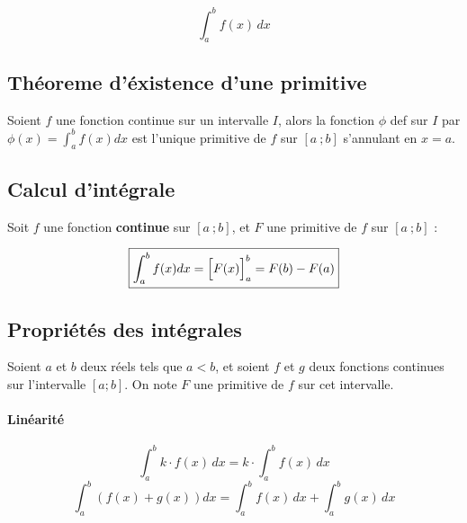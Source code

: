 \documentclass{report}
\begin{document}
      \[
        \int_{a}^{b} f(x) \, dx
      \]
    \subsection{Théoreme d'éxistence d'une primitive}

      Soient $f$ une fonction continue sur un intervalle $I$, alors la fonction $\phi$ def sur $I$ par $\displaystyle\phi(x) = \int_{a}^{b}f(x)dx$ est l'unique primitive de $f$ sur $\left[a ~; b\right]$ s'annulant en $x=a$.

    \subsection{Calcul d'intégrale}

      Soit $f$ une fonction \textbf{continue} sur $\left[a ~; b\right]$, et $F$ une primitive de $f$ sur $\left[a ~; b\right]$ : 

      \[\boxed{\int_{a}^{b}f(x)dx = \Bigl[ F(x) \Bigr]^b_a = F(b) - F(a)}\]


    \subsection{Propriétés des intégrales}

      Soient \( a \) et \( b \) deux réels tels que \( a < b \), et soient \( f \) et \( g \) deux fonctions continues sur l’intervalle \( [a ; b] \). On note \( F \) une primitive de \( f \) sur cet intervalle.

      \paragraph{Linéarité}
      \[
      \int_a^b k \cdot f(x) \, dx = k \cdot \int_a^b f(x)\, dx
      \]
      \[
      \int_a^b \left( f(x) + g(x) \right) dx = \int_a^b f(x)\, dx + \int_a^b g(x)\, dx
      \]

      \iffalse\paragraph{Relation de Chasles}
      Pour tout \( c \in [a ; b] \) :
      \[
      \int_a^b f(x)\, dx = \int_a^c f(x)\, dx + \int_c^b f(x)\, dx
      \]
 
      \paragraph{Positivité}
      \begin{itemize}
        \item Si \( f(x) \geq 0 \) sur \( [a ; b] \), alors \( \int_a^b f(x)\, dx \geq 0 \)
        \item Si \( f(x) < 0 \) sur \( [a ; b] \), alors \( \int_a^b f(x)\, dx < 0 \)
      \end{itemize}\fi
\end{document}
